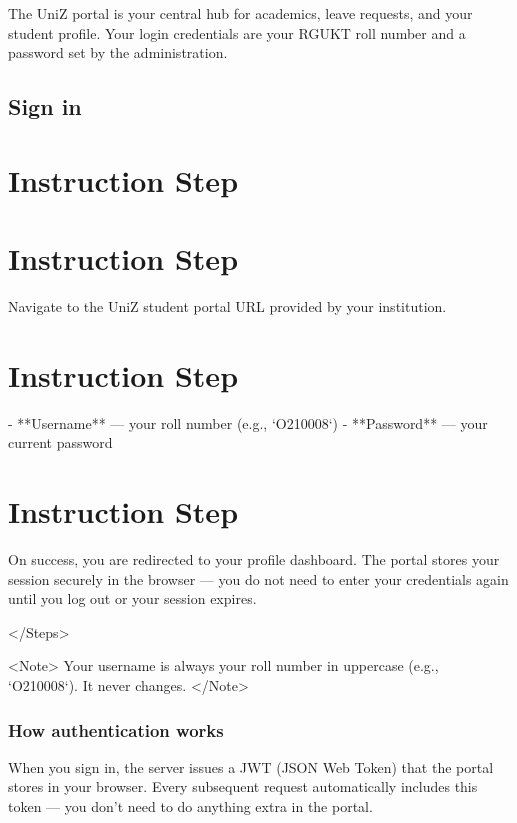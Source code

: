 


The UniZ portal is your central hub for academics, leave requests, and your student profile. Your login credentials are your RGUKT roll number and a password set by the administration.

\subsection{Sign in}


\section{Instruction Step}

  
\section{Instruction Step}

    Navigate to the UniZ student portal URL provided by your institution.
  
  
\section{Instruction Step}

    - **Username** — your roll number (e.g., `O210008`) - **Password** — your
    current password
  
  
\section{Instruction Step}

    On success, you are redirected to your profile dashboard. The portal stores
    your session securely in the browser — you do not need to enter your
    credentials again until you log out or your session expires.
  
</Steps>

<Note>
  Your username is always your roll number in uppercase (e.g., `O210008`). It
  never changes.
</Note>

\subsubsection{How authentication works}

When you sign in, the server issues a JWT (JSON Web Token) that the portal stores in your browser. Every subsequent request automatically includes this token — you don't need to do anything extra in the portal.

